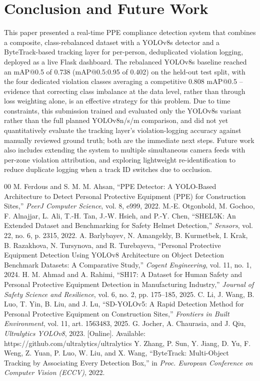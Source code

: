 \documentclass[conference]{IEEEtran}
\begin{document}
\section{Conclusion and Future Work}

This paper presented a real-time PPE compliance detection system that combines a composite, class-rebalanced dataset with a YOLOv8s detector and a ByteTrack-based tracking layer for per-person, deduplicated violation logging, deployed as a live Flask dashboard. The rebalanced YOLOv8s baseline reached an mAP@0.5 of 0.738 (mAP@0.5:0.95 of 0.402) on the held-out test split, with the four dedicated violation classes averaging a competitive 0.808 mAP@0.5 -- evidence that correcting class imbalance at the data level, rather than through loss weighting alone, is an effective strategy for this problem. Due to time constraints, this submission trained and evaluated only the YOLOv8s variant rather than the full planned YOLOv8n/s/m comparison, and did not yet quantitatively evaluate the tracking layer's violation-logging accuracy against manually reviewed ground truth; both are the immediate next steps. Future work also includes extending the system to multiple simultaneous camera feeds with per-zone violation attribution, and exploring lightweight re-identification to reduce duplicate logging when a track ID switches due to occlusion.

\begin{thebibliography}{00}
 M. Ferdous and S. M. M. Ahsan, ``PPE Detector: A YOLO-Based Architecture to Detect Personal Protective Equipment (PPE) for Construction Sites,'' \emph{PeerJ Computer Science}, vol. 8, e999, 2022.
 M.-E. Otgonbold, M. Gochoo, F. Alnajjar, L. Ali, T.-H. Tan, J.-W. Hsieh, and P.-Y. Chen, ``SHEL5K: An Extended Dataset and Benchmarking for Safety Helmet Detection,'' \emph{Sensors}, vol. 22, no. 6, p. 2315, 2022.
 A. Barlybayev, N. Amangeldy, B. Kurmetbek, I. Krak, B. Razakhova, N. Tursynova, and R. Turebayeva, ``Personal Protective Equipment Detection Using YOLOv8 Architecture on Object Detection Benchmark Datasets: A Comparative Study,'' \emph{Cogent Engineering}, vol. 11, no. 1, 2024.
 H. M. Ahmad and A. Rahimi, ``SH17: A Dataset for Human Safety and Personal Protective Equipment Detection in Manufacturing Industry,'' \emph{Journal of Safety Science and Resilience}, vol. 6, no. 2, pp. 175--185, 2025.
 C. Li, J. Wang, B. Luo, T. Yin, B. Liu, and J. Lu, ``SD-YOLOv5: A Rapid Detection Method for Personal Protective Equipment on Construction Sites,'' \emph{Frontiers in Built Environment}, vol. 11, art. 1563483, 2025.
 G. Jocher, A. Chaurasia, and J. Qiu, \emph{Ultralytics YOLOv8}, 2023. [Online]. Available: https://github.com/ultralytics/ultralytics
 Y. Zhang, P. Sun, Y. Jiang, D. Yu, F. Weng, Z. Yuan, P. Luo, W. Liu, and X. Wang, ``ByteTrack: Multi-Object Tracking by Associating Every Detection Box,'' in \emph{Proc. European Conference on Computer Vision (ECCV)}, 2022.
\end{thebibliography}
\end{document}
